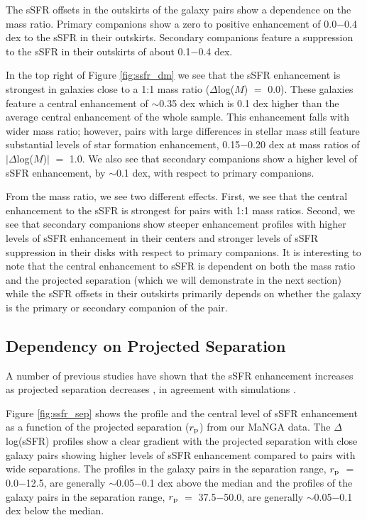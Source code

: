 \documentclass[iop,revtex4,twocolumn,apj,numberedappendix,appendixfloats]{emulateapj}
\begin{document}
The sSFR offsets in the outskirts of the galaxy pairs show a dependence on the mass ratio. Primary companions show a zero to positive enhancement of 0.0$-$0.4 dex to the sSFR in their outskirts. Secondary companions feature a suppression to the sSFR in their outskirts of about 0.1$-$0.4 dex. 

In the top right of Figure \ref{fig:ssfr_dm} we see that the sSFR enhancement is strongest in galaxies close to a 1:1 mass ratio ($\Delta$log($M$) $=$ 0.0). These galaxies feature a central enhancement of $\sim$0.35 dex which is 0.1 dex higher than the average central enhancement of the whole sample. This enhancement falls with wider mass ratio; however, pairs with large differences in stellar mass still feature substantial levels of star formation enhancement, 0.15$-$0.20 dex at mass ratios of $|\Delta$log($M$)$|$ $=$ 1.0. We also see that secondary companions show a higher level of sSFR enhancement, by $\sim$0.1 dex, with respect to primary companions. 

From the mass ratio, we see two different effects. First, we see that the central enhancement to the sSFR is strongest for pairs with 1:1 mass ratios. Second, we see that secondary companions show steeper enhancement profiles with higher levels of sSFR enhancement in their centers and stronger levels of sSFR suppression in their disks with respect to primary companions. It is interesting to note that the central enhancement to sSFR is dependent on both the mass ratio and the projected separation (which we will demonstrate in the next section) while the sSFR offsets in their outskirts primarily depends on whether the galaxy is the primary or secondary companion of the pair.

\subsection{Dependency on Projected Separation}\label{sec:sep}

A number of previous studies have shown that the sSFR enhancement increases as projected separation decreases \citep[e.g.,][]{Li:2008, Ellison:2008, Scudder:2012, Patton:2013}, in agreement with simulations \citep{Scudder:2012}. 

Figure \ref{fig:ssfr_sep} shows the profile and the central level of sSFR enhancement as a function of the projected separation ($r_{\rm p}$) from our MaNGA data. The $\Delta$log(sSFR) profiles show a clear gradient with the projected separation with close galaxy pairs showing higher levels of sSFR enhancement compared to pairs with wide separations. The profiles in the galaxy pairs in the separation range, $r_{\rm p}$ $=$ 0.0$-$12.5, are generally $\sim$0.05$-$0.1 dex above the median and the profiles of the galaxy pairs in the separation range, $r_{\rm p}$ $=$ 37.5$-$50.0, are generally $\sim$0.05$-$0.1 dex below the median. 
\end{document}
